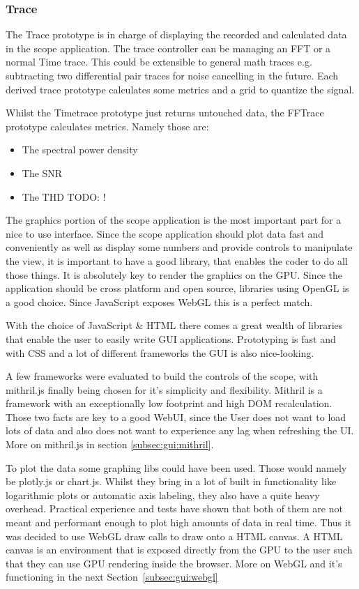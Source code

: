\subsubsection*{Trace}

The Trace prototype is in charge of displaying the recorded and calculated data in the scope application.
The trace controller can be managing an FFT or a normal Time trace. This could be extensible to general math traces e.g. subtracting two differential pair traces for noise cancelling in the future.
Each derived trace prototype calculates some metrics and a grid to quantize the signal.

Whilst the Timetrace prototype just returns untouched data, the FFTrace prototype calculates metrics. Namely those are:

\begin{itemize}
    \item The spectral power density
    \item The SNR
    \item The THD TODO: !
\end{itemize}

The graphics portion of the scope application is the most important part for a nice to use interface. Since the scope application should plot data fast and conveniently as well as display some numbers and provide controls to manipulate the view, it is important to have a good library, that enables the coder to do all those things. It is absolutely key to render the graphics on the GPU. Since the application should be cross platform and open source, libraries using OpenGL is a good choice. Since JavaScript exposes WebGL this is a perfect match.

With the choice of JavaScript \& HTML there comes a great wealth of libraries that enable the user to easily write GUI applications. Prototyping is fast and with CSS and a lot of different frameworks the GUI is also nice-looking.

A few frameworks were evaluated to build the controls of the scope, with mithril.js finally being chosen for it's simplicity and flexibility. Mithril is a framework with an exceptionally low footprint and high DOM recalculation.
Those two facts are key to a good WebUI, since the User does not want to load lots of data and also does not want to experience any lag when refreshing the UI.
More on mithril.js in section \ref{subsec:gui:mithril}.

To plot the data some graphing libs could have been used. Those would namely be plotly.js or chart.js. Whilst they bring in a lot of built in functionality like logarithmic plots or automatic axis labeling, they also have a quite heavy overhead.
Practical experience and tests have shown that both of them are not meant and performant enough to plot high amounts of data in real time.
Thus it was decided to use WebGL draw calls to draw onto a HTML canvas. A HTML canvas is an environment that is exposed directly from the GPU to the user such that they can use GPU rendering inside the browser.
More on WebGL and it's functioning in the next Section~\ref{subsec:gui:webgl}

